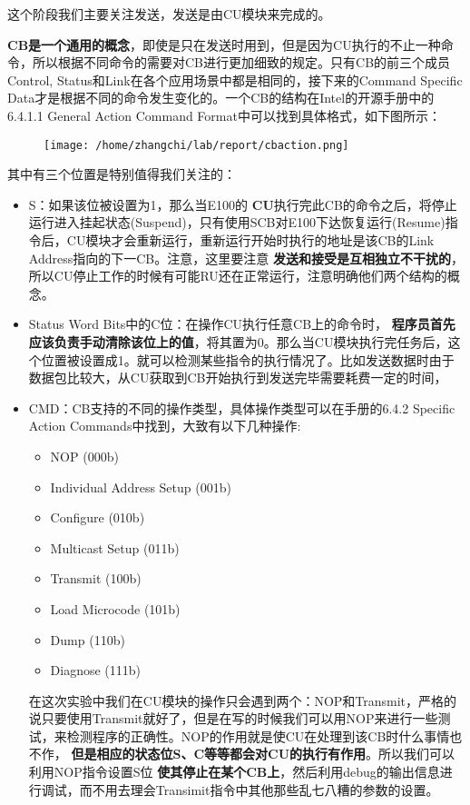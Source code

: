 \documentclass{article}
\newcommand{\highlight}[1]{{\bfseries \color{red}  #1}}
\begin{document}
\begin{CJK*}{UTF8}{gkai}
这个阶段我们主要关注发送，发送是由CU模块来完成的。

\highlight{CB是一个通用的概念}，即使是只在发送时用到，但是因为CU执行的不止一种命令，所以根据不同命令的需要对CB进行更加细致的规定。只有CB的前三个成员Control, Status和Link在各个应用场景中都是相同的，接下来的Command Specific Data才是根据不同的命令发生变化的。一个CB的结构在Intel的开源手册中的6.4.1.1 General Action Command Format中可以找到具体格式，如下图所示：


\begin{figure}[htp]
\centering
\texttt{[image: /home/zhangchi/lab/report/cbaction.png]}
\end{figure}

其中有三个位置是特别值得我们关注的：

\begin{itemize}
\item{S：如果该位被设置为1，那么当E100的\highlight{CU}执行完此CB的命令之后，将停止运行进入挂起状态(Suspend)，只有使用SCB对E100下达恢复运行(Resume)指令后，CU模块才会重新运行，重新运行开始时执行的地址是该CB的Link Address指向的下一CB。注意，这里要注意\highlight{发送和接受是互相独立不干扰的}，所以CU停止工作的时候有可能RU还在正常运行，注意明确他们两个结构的概念。}
\item{Status Word Bits中的C位：在操作CU执行任意CB上的命令时，\highlight{程序员首先应该负责手动清除该位上的值}，将其置为0。那么当CU模块执行完任务后，这个位置被设置成1。就可以检测某些指令的执行情况了。比如发送数据时由于数据包比较大，从CU获取到CB开始执行到发送完毕需要耗费一定的时间，
}
\item{CMD：CB支持的不同的操作类型，具体操作类型可以在手册的6.4.2 Specific Action Commands中找到，大致有以下几种操作:

\begin{itemize}
\item{NOP (000b)}
\item{Individual Address Setup (001b)}
\item{Configure (010b)}
\item{Multicast Setup (011b)}
\item{Transmit (100b)}
\item{Load Microcode (101b)}
\item{Dump (110b)}
\item{Diagnose (111b)}
\end{itemize}

在这次实验中我们在CU模块的操作只会遇到两个：NOP和Transmit，严格的说只要使用Transmit就好了，但是在写的时候我们可以用NOP来进行一些测试，来检测程序的正确性。NOP的作用就是使CU在处理到该CB时什么事情也不作，\highlight{但是相应的状态位S、C等等都会对CU的执行有作用}。所以我们可以利用NOP指令设置S位\highlight{使其停止在某个CB上}，然后利用debug的输出信息进行调试，而不用去理会Transimit指令中其他那些乱七八糟的参数的设置。
}
\end{itemize}


\end{CJK*}
\end{document}
